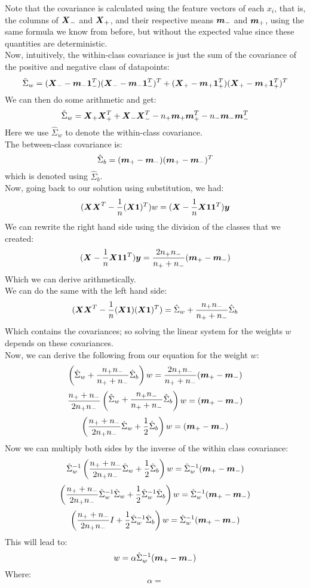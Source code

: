 \documentclass[12pt]{article}
\begin{document}
Note that the covariance is calculated
using the feature vectors of each $x_i$,
that is, the columns of $\boldsymbol{X}_-$ and $\boldsymbol{X}_+$,
and their respective means $\boldsymbol{m}_-$ and $\boldsymbol{m}_+$,
using the same formula we know from before,
but without the expected value since these quantities 
are deterministic. \\

Now, intuitively, the within-class covariance
is just the sum of the covariance of the positive
and negative class of datapoints:
\[ \hat{\Sigma}_w 
= (\boldsymbol{X}_- - \boldsymbol{m}_-\boldsymbol{1}^T_-)(\boldsymbol{X}_- 
- \boldsymbol{m}_-\boldsymbol{1}^T_-)^T
+ (\boldsymbol{X}_+ - \boldsymbol{m}_+\boldsymbol{1}^T_+)(\boldsymbol{X}_+ 
- \boldsymbol{m}_+\boldsymbol{1}^T_+)^T \]
We can then do some arithmetic and get:
\[ \hat{\Sigma}_w = \boldsymbol{X}_+\boldsymbol{X}^T_+
+ \boldsymbol{X}_-\boldsymbol{X}^T_- -n_+\boldsymbol{m}_+\boldsymbol{m}^T_+
-n_-\boldsymbol{m}_-\boldsymbol{m}^T_- \]
Here we use $\hat{\Sigma}_w$ to denote the within-class
covariance. \\

The between-class covariance is:
\[ \hat{\Sigma}_b = (\boldsymbol{m}_+ - \boldsymbol{m}_-)(\boldsymbol{m}_+ - \boldsymbol{m}_-)^T \]
which is denoted using $\hat{\Sigma}_b$. \\

Now, going back to our solution using substitution, we had:
\[ (\boldsymbol{X}\boldsymbol{X}^T - \dfrac{1}{n}(\boldsymbol{X}\boldsymbol{1})^T) w
= (\boldsymbol{X} - \dfrac{1}{n}\boldsymbol{X}\boldsymbol{1} \boldsymbol{1}^T) \boldsymbol{y} \]
We can rewrite the right hand side
using the division of the classes
that we created:
\[ (\boldsymbol{X} - \dfrac{1}{n}\boldsymbol{X}\boldsymbol{1} \boldsymbol{1}^T)\boldsymbol{y}
= \dfrac{2n_+n_-}{n_+ + n_-}(\boldsymbol{m}_+ - \boldsymbol{m}_-) \]
Which we can derive arithmetically. \\
We can do the same with the left hand side:
\[ (\boldsymbol{X}\boldsymbol{X}^T - \dfrac{1}{n}(\boldsymbol{X}\boldsymbol{1})(\boldsymbol{X}\boldsymbol{1})^T)
= \hat{\Sigma}_w + \dfrac{n_+n_-}{n_+ + n_-}\hat{\Sigma}_b \]
Which contains the covariances;
so solving the linear system for the weights $w$
depends on these covariances. \\

Now, we can derive the following from our equation
for the weight $w$:
\[ \left( \hat{\Sigma}_w + 
\dfrac{n_+n_-}{n_+ + n_-}\hat{\Sigma}_b \right)w
= \dfrac{2n_+n_-}{n_+ + n_-}(\boldsymbol{m}_+ - \boldsymbol{m}_-) \]
\[ \dfrac{n_+ + n_-}{2n_+n_-}\begin{pmatrix} \hat{\Sigma}_w + 
\dfrac{n_+n_-}{n_+ + n_-}\hat{\Sigma}_b \end{pmatrix}w
= (\boldsymbol{m}_+ - \boldsymbol{m}_-) \]
\[ \left( \dfrac{n_+ + n_-}{2n_+n_-}\hat{\Sigma}_w + 
\dfrac{1}{2}\hat{\Sigma}_b \right)w
= (\boldsymbol{m}_+ - \boldsymbol{m}_-) \]
Now we can multiply both sides by the inverse
of the within class covariance:
\[ \hat{\Sigma}^{-1}_w
\left( \dfrac{n_+ + n_-}{2n_+n_-}\hat{\Sigma}_w + 
\dfrac{1}{2}\hat{\Sigma}_b \right)w
= \hat{\Sigma}^{-1}_w(\boldsymbol{m}_+ - \boldsymbol{m}_-) \]
\[\left( \dfrac{n_+ + n_-}{2n_+n_-}\hat{\Sigma}^{-1}_w\hat{\Sigma}_w + 
\dfrac{1}{2}\hat{\Sigma}^{-1}_w\hat{\Sigma}_b \right)w
= \hat{\Sigma}^{-1}_w(\boldsymbol{m}_+ - \boldsymbol{m}_-) \]
\[\left( \dfrac{n_+ + n_-}{2n_+n_-}I + 
\dfrac{1}{2}\hat{\Sigma}^{-1}_w\hat{\Sigma}_b \right)w
= \hat{\Sigma}^{-1}_w(\boldsymbol{m}_+ - \boldsymbol{m}_-) \]
This will lead to:
\[ w = \alpha \hat{\Sigma}^{-1}_w (\boldsymbol{m}_+ - \boldsymbol{m}_-) \]
Where:
\[ \alpha =  \]
\end{document}
